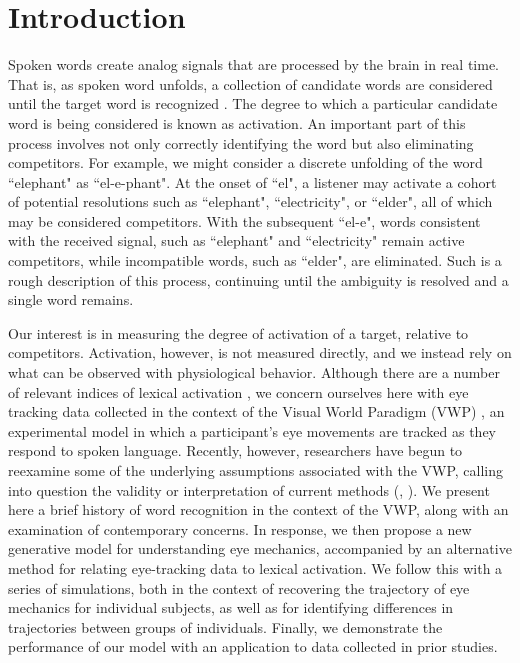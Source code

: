 \section{Introduction}


Spoken words create analog signals that are processed by the brain in real time. That is, as spoken word unfolds, a collection of candidate words are considered until the target word is recognized \citep{MarslenWilson1987}. The degree to which a particular candidate word is being considered is known as activation. An important part of this process involves not only correctly identifying the word but also eliminating competitors. For example, we might consider a discrete unfolding of the word ``elephant" as ``el-e-phant". At the onset of ``el", a listener may activate a cohort of potential resolutions such as ``elephant", ``electricity", or ``elder", all of which may be considered competitors. With the subsequent ``el-e", words consistent with the received signal, such as ``elephant" and ``electricity" remain active competitors, while incompatible words, such as ``elder", are eliminated. Such is a rough description of this process, continuing until the ambiguity is resolved and a single word remains.


Our interest is in measuring the degree of activation of a target, relative to competitors. Activation, however, is not measured directly, and we instead rely on what can be observed with physiological behavior. Although there are a number of relevant indices of lexical activation \citep{Spivey2005}, we concern ourselves here with eye tracking data collected in the context of the Visual World Paradigm (VWP) \cite{tanenhaus1995integration}, an experimental model in which a participant's eye movements are tracked as they respond to spoken language. Recently, however, researchers have begun to reexamine some of the underlying assumptions associated with the VWP, calling into question the validity or interpretation of current methods (\cite{Magnuson2019}, \cite{mcmurray2022m}). We present here a brief history of word recognition in the context of the VWP, along with an examination of contemporary concerns. In response, we then propose a new generative model for understanding eye mechanics, accompanied by an alternative method for relating eye-tracking data to lexical activation. We follow this with a series of simulations, both in the context of recovering the trajectory of eye mechanics for individual subjects, as well as for identifying differences in trajectories between groups of individuals. Finally, we demonstrate the performance of our model with an application to data collected in prior studies. 







